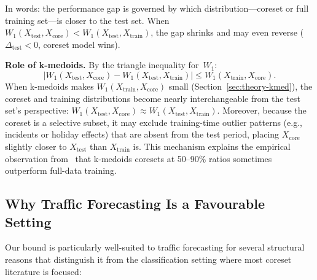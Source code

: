 \documentclass[journal]{IEEEtran}
\newcommand{\Wone}{W_1}
\newcommand{\Xtrain}{X_{\mathrm{train}}}
\newcommand{\Xtest}{X_{\mathrm{test}}}
\newcommand{\Xcore}{X_{\mathrm{core}}}
\begin{document}
In words: the performance gap is governed by which
distribution---coreset or full training set---is closer to the test
set.
When $\Wone(\Xtest, \Xcore) < \Wone(\Xtest, \Xtrain)$, the gap
shrinks and may even reverse ($\Delta_{\mathrm{test}} < 0$, coreset
model wins).

\textbf{Role of k-medoids.}
By the triangle inequality for~$\Wone$:
\begin{equation}
  \bigl|
    \Wone(\Xtest, \Xcore) - \Wone(\Xtest, \Xtrain)
  \bigr|
  \le \Wone(\Xtrain, \Xcore).
\end{equation}
When k-medoids makes $\Wone(\Xtrain, \Xcore)$ small
(Section~\ref{sec:theory-kmed}), the coreset and training
distributions become nearly interchangeable from the test set's
perspective:
$\Wone(\Xtest, \Xcore) \approx \Wone(\Xtest, \Xtrain)$.
Moreover, because the coreset is a selective subset, it may exclude
training-time outlier patterns (e.g., incidents or holiday effects)
that are absent from the test period, placing $\Xcore$ slightly
closer to $\Xtest$ than $\Xtrain$ is.
This mechanism explains the empirical observation
from~\cite{our_itsc} that k-medoids coresets at 50--90\% ratios
sometimes outperform full-data training.


\subsection{Why Traffic Forecasting Is a Favourable Setting}
\label{sec:theory-traffic}

Our bound is particularly well-suited to traffic forecasting for
several structural reasons that distinguish it from the
classification setting where most coreset literature is focused:
\end{document}
